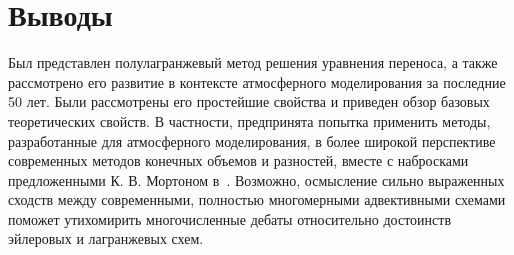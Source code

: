 \chapter{Выводы} \label{chapt_10}
Был представлен полулагранжевый метод решения уравнения переноса, а также рассмотрено его развитие в контексте атмосферного моделирования за последние 50 лет. Были рассмотрены его простейшие свойства и приведен обзор базовых теоретических свойств. В частности, предпринята попытка применить методы, разработанные для атмосферного моделирования, в более широкой перспективе современных методов конечных объемов и разностей, вместе с набросками предложенными К. В. Мортоном в~\cite{A43}. Возможно, осмысление сильно выраженных сходств между современными, полностью многомерными адвективными схемами поможет утихомирить многочисленные дебаты относительно достоинств эйлеровых и лагранжевых схем.
